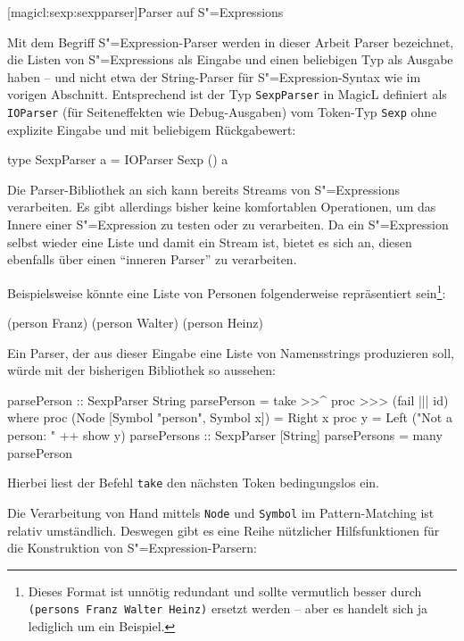 \documentclass[12pt, a4paper, bibgerm]{scrbook}
\newenvironment{DIFnomarkup}{}{}
\newcommand\icode[1]{\lstinline?#1?}
\newcommand\lsubsection{}
\newcommand{\sexp}{S"=Expression}
\newcommand{\sexps}{S"=Expressions}
\begin{document}
\lsubsection[magicl:sexp:sexpparser]{Parser auf \sexps}

Mit dem Begriff \sexp{}-Parser werden in dieser Arbeit Parser
bezeichnet, die Listen von \sexps{} als Eingabe und einen beliebigen Typ
als Ausgabe haben -- und nicht etwa der String-Parser für \sexp{}-Syntax
wie im vorigen Abschnitt. Entsprechend ist der Typ \icode{SexpParser} in
MagicL definiert als \icode{IOParser} (für Seiteneffekten wie
Debug-Ausgaben) vom Token-Typ \icode{Sexp} ohne explizite Eingabe und
mit beliebigem Rückgabewert:
\begin{DIFnomarkup}\begin{code}
type SexpParser a = IOParser Sexp () a  
\end{code}\end{DIFnomarkup}
Die Parser-Bibliothek an sich kann bereits Streams von \sexps{}
verarbeiten. Es gibt allerdings bisher keine komfortablen Operationen,
um das Innere einer \sexp{} zu testen oder zu verarbeiten. Da ein
\sexp{} selbst wieder eine Liste und damit ein Stream ist, bietet es
sich an, diesen ebenfalls über einen "`inneren Parser"' zu verarbeiten.

Beispielsweise könnte eine Liste von Personen folgenderweise
repräsentiert sein\footnote{Dieses Format ist unnötig redundant und
  sollte vermutlich besser durch \icode{(persons Franz Walter Heinz)}
  ersetzt werden -- aber es handelt sich ja lediglich um ein Beispiel.}:
\begin{DIFnomarkup}\begin{code}
(person Franz)
(person Walter)
(person Heinz)
\end{code}\end{DIFnomarkup}

Ein Parser, der aus dieser Eingabe eine Liste von Namensstrings
produzieren soll, würde mit der bisherigen Bibliothek so aussehen:

\begin{DIFnomarkup}\begin{code}
parsePerson :: SexpParser String
parsePerson = take >>^ proc >>> (fail ||| id)
  where proc (Node [Symbol "person", Symbol x]) = Right x
        proc y = Left ("Not a person: " ++ show y)
parsePersons :: SexpParser [String]
parsePersons = many parsePerson
\end{code}\end{DIFnomarkup} %
Hierbei liest der Befehl \icode{take} den nächsten Token bedingungslos
ein.

Die Verarbeitung von Hand mittels \icode{Node} und \icode{Symbol} im
Pattern-Matching ist relativ umständlich. Deswegen gibt es eine Reihe
nützlicher Hilfsfunktionen für die Konstruktion von \sexp{}-Parsern:
\end{document}
